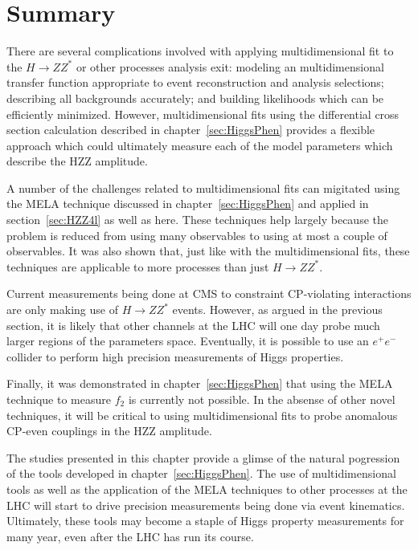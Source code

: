 \section{Summary}

There are several complications involved with applying
multidimensional fit to the $H\to ZZ^*$ or other processes
analysis exit:
modeling an multidimensional transfer function appropriate
to event reconstruction and analysis selections; describing all 
backgrounds accurately; and building likelihoods which can be
efficiently minimized. However, multidimensional fits using the
differential cross section calculation described in
chapter~\ref{sec:HiggsPhen} provides a flexible approach which
could ultimately measure each of the model parameters which 
describe the HZZ amplitude.  

A number of the challenges related to multidimensional fits
can migitated using the MELA
technique discussed in chapter~\ref{sec:HiggsPhen} and applied
in section~\ref{sec:HZZ4l} as well as here.  These techniques
help largely because the problem is reduced from using
many observables to using at most a couple of observables.  It
was also shown that, just like with the multidimensional fits,
these techniques are applicable to more processes than just 
$H\to ZZ^*$.

Current measurements being done at CMS to constraint 
CP-violating interactions are only making use of $H\to ZZ^*$
events.  However, as argued in the previous section, it is
likely that other channels at the LHC will one day probe much
larger regions of the parameters space.  Eventually, it is 
possible to use an $e^+e^-$ collider to perform high precision
measurements of Higgs properties. 

Finally, it was demonstrated in chapter~\ref{sec:HiggsPhen}
that using the MELA technique to measure $f_{2}$ is currently 
not possible.  In the absense of other novel techniques, it
will be critical to using multidimensional fits to probe 
anomalous CP-even couplings in the HZZ amplitude.  

The studies presented in this chapter provide a glimse of the 
natural pogression of the tools developed in
chapter~\ref{sec:HiggsPhen}.  The use of multidimensional 
tools as well as the application of the MELA techniques to
other processes at the LHC will start to drive precision
measurements being done via event kinematics.  Ultimately, 
these tools may become a staple of Higgs property measurements
for many year, even after the LHC has run its course.  




